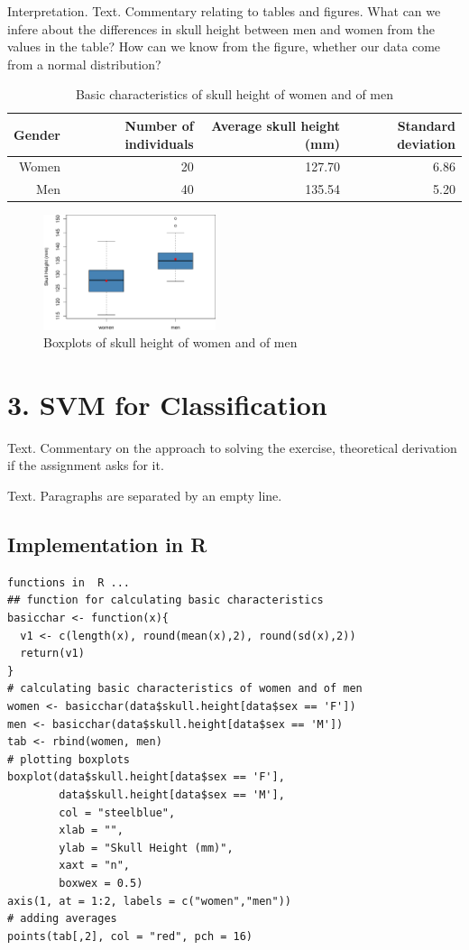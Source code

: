  Interpretation. Text. Commentary relating to tables and figures. What can we infere about the differences in skull height between men and women from the values in the table? How can we know from the figure, whether our data come from a normal distribution?

\begin{table}[ht]
\footnotesize
\centering

\begin{tabular}{r||rrr}
 Gender & Number of individuals & Average skull height (mm) & Standard deviation \\ 
 \hline \hline
Women & 20 & 127.70 & 6.86 \\ 
Men & 40 & 135.54 & 5.20 \\ 
\end{tabular}
\caption{Basic characteristics of skull height of women and of men}
\end{table}


\begin{figure}[ht]
\centering
\includegraphics[angle=0,width=0.45\textwidth]{boxplot-example.pdf}
\caption{Boxplots of skull height of women and of men}
\end{figure}

\section*{3. SVM for Classification}
\noindent Text. Commentary on the approach to solving the exercise, theoretical derivation if the assignment asks for it.

Text. Paragraphs are separated by an empty line. 

\subsection*{Implementation in R}
\begin{lstlisting}
functions in  R ...
## function for calculating basic characteristics
basicchar <- function(x){
  v1 <- c(length(x), round(mean(x),2), round(sd(x),2))
  return(v1)
}
# calculating basic characteristics of women and of men
women <- basicchar(data$skull.height[data$sex == 'F'])
men <- basicchar(data$skull.height[data$sex == 'M'])
tab <- rbind(women, men)
# plotting boxplots
boxplot(data$skull.height[data$sex == 'F'], 
        data$skull.height[data$sex == 'M'],
        col = "steelblue", 
        xlab = "",
        ylab = "Skull Height (mm)",
        xaxt = "n", 
        boxwex = 0.5)
axis(1, at = 1:2, labels = c("women","men"))
# adding averages
points(tab[,2], col = "red", pch = 16)
\end{lstlisting}

